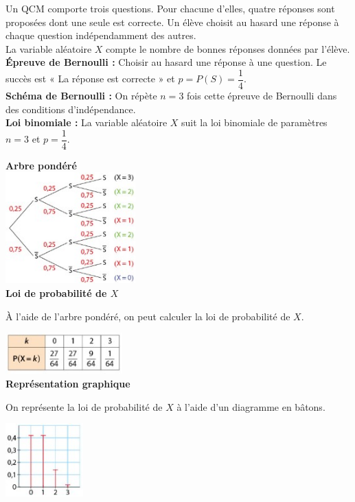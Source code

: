 \documentclass[a4paper,11pt,cours]{nsi} %
\begin{document}
\begin{exemple}[]
    Un QCM comporte trois questions. Pour chacune d'elles, quatre réponses sont proposées dont une seule est correcte. Un élève choisit au hasard une réponse à chaque question indépendamment des autres.\\
    La variable aléatoire $X$ compte le nombre de bonnes réponses données par l'élève.\\

    \textbf{Épreuve de Bernoulli :} Choisir au hasard une réponse à une question. Le succès est « La réponse est correcte » et $p=P(S)=\dfrac{1}{4}$.\\[.5em]
    \textbf{Schéma de Bernoulli :} On répète $n=3$ fois cette épreuve de Bernoulli dans des conditions d'indépendance.\\[.5em]
    \textbf{Loi binomiale :} La variable aléatoire $X$ suit la loi binomiale de paramètres $n=3$ et $p=\dfrac{1}{4}$.\\
    \setlength{\columnseprule}{0.5pt}
    \begin{multicols}{3}
        \begin{center}
            \textbf{Arbre pondéré}\\[1em]
            \includegraphics[width=5cm]{arbre.jpg}\\
            \vfill\null\columnbreak
            \textbf{Loi de probabilité de $X$}
        \end{center}
            À l'aide de l'arbre pondéré, on peut calculer la loi de probabilité de $X$.
        \begin{center}
            \includegraphics[width=4.5cm]{tableau.jpg}\\
            \vfill\null\columnbreak
            \textbf{Représentation graphique}
        \end{center}
            On représente la loi de probabilité de $X$ à l'aide d'un diagramme en bâtons.
        \begin{center}
            \includegraphics[width=3cm]{diagramme.jpg}
        \end{center}
    \end{multicols}
\end{exemple}
\end{document}
